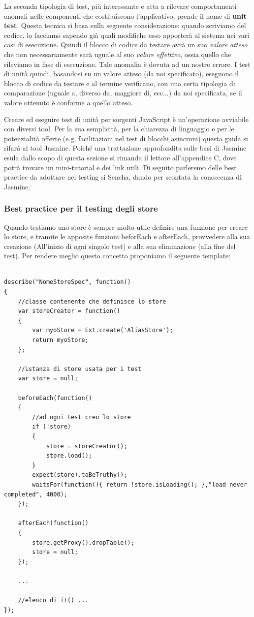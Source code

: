 \documentclass[10pt,a4paper,onecolumn]{article}
\begin{document}
La seconda tipologia di test, più interessante e atta a rilevare comportamenti anomali nelle componenti che costituiscono l'applicativo, prende il nome di \textbf{unit test}. Questa tecnica si basa sulla seguente considerazione: quando scriviamo del codice, lo facciamo sapendo già quali modifiche esso apporterà al sistema nei vari casi di esecuzione. Quindi il blocco di codice da testare avrà un suo \emph{valore atteso} che non necessariamente sarà uguale al suo \emph{valore effettivo}, ossia quello che rileviamo in fase di esecuzione. Tale anomalia è dovuta ad un nostro errore. I test di unità quindi, basandosi su un valore atteso (da noi specificato), eseguono il blocco di codice da testare e al termine verificano, con una certa tipologia di comparazione (uguale a, diverso da, maggiore di, ecc...) da noi specificata, se il valore ottenuto è conforme a quello atteso.

Creare ed eseguire test di unità per sorgenti JavaScript è un'operazione avviabile  con diversi tool. Per la sua semplicità, per la chiarezza di linguaggio e per le potenzialità offerte (e.g. facilitazioni nel test di blocchi asincroni) questa guida si rifarà al tool Jasmine. Poiché una trattazione approfondita sulle basi di Jasmine esula dallo scopo di questa sezione si rimanda il lettore all'appendice C, dove potrà trovare un mini-tutorial e dei link utili. Di seguito parleremo delle best practice da adottare nel testing si Sencha, dando per scontata la conoscenza di Jasmine.

\subsubsection{Best practice per il testing degli store}

Quando testiamo uno store è sempre molto utile definire una funzione per creare lo store, e tramite le apposite funzioni beforEach e afterEach, provvedere alla sua creazione (All'inizio di ogni singolo test) e alla sua eliminazione (alla fine del test). Per rendere meglio questo concetto proponiamo il seguente template:

\begin{lstlisting}

describe("NomeStoreSpec", function() 
{
	//classe contenente che definisce lo store
	var storeCreator = function()
	{
		var myoStore = Ext.create('AliasStore');
		return myoStore;
	};
	
	//istanza di store usata per i test
	var store = null;
	
	beforeEach(function()
	{
		//ad ogni test creo lo store
		if (!store) 
		{
			store = storeCreator();
			store.load();
		}
		expect(store).toBeTruthy();
		waitsFor(function(){ return !store.isLoading(); },"load never completed", 4000);
	});
	
	afterEach(function()
	{
		store.getProxy().dropTable();
		store = null;
	});
	
	...
	
	//elenco di it() ... 
});
\end{lstlisting}
\end{document}
